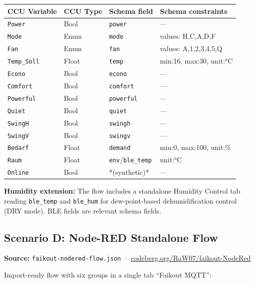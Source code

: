 \documentclass[11pt,a4paper]{article}
\newcommand{\field}[1]{\texttt{\color{codegreen}#1}}
\begin{document}
\begin{tabular}{@{}llll@{}}
\toprule
\textbf{CCU Variable} & \textbf{CCU Type} & \textbf{Schema field} & \textbf{Schema constraints} \\
\midrule
\rowcolor{lightbg}
\texttt{Power}     & Bool    & \field{power}   & — \\
\texttt{Mode}      & Enum    & \field{mode}    & values: H,C,A,D,F \\
\rowcolor{lightbg}
\texttt{Fan}       & Enum    & \field{fan}     & values: A,1,2,3,4,5,Q \\
\texttt{Temp\_Soll}& Float   & \field{temp}    & min:16, max:30, unit:°C \\
\rowcolor{lightbg}
\texttt{Econo}     & Bool    & \field{econo}   & — \\
\texttt{Comfort}   & Bool    & \field{comfort} & — \\
\rowcolor{lightbg}
\texttt{Powerful}  & Bool    & \field{powerful}& — \\
\texttt{Quiet}     & Bool    & \field{quiet}   & — \\
\rowcolor{lightbg}
\texttt{SwingH}    & Bool    & \field{swingh}  & — \\
\texttt{SwingV}    & Bool    & \field{swingv}  & — \\
\rowcolor{lightbg}
\texttt{Bedarf}    & Float   & \field{demand}  & min:0, max:100, unit:\% \\
\texttt{Raum}      & Float   & \field{env}/\field{ble\_temp} & unit:°C \\
\rowcolor{lightbg}
\texttt{Online}    & Bool    & *(synthetic)*   & — \\
\bottomrule
\end{tabular}

\vspace{4pt}
\textbf{Humidity extension:} The flow includes a standalone Humidity Control tab reading \field{ble\_temp} and \field{ble\_hum} for dew-point-based dehumidification control (DRY mode). BLE fields are relevant schema fields.

\subsection{Scenario D: Node-RED Standalone Flow}

\textbf{Source:} \texttt{faikout-nodered-flow.json} · \href{https://codeberg.org/RaW07/faikout-NodeRed}{codeberg.org/RaW07/faikout-NodeRed}

Import-ready flow with six groups in a single tab ``Faikout MQTT'':
\end{document}
